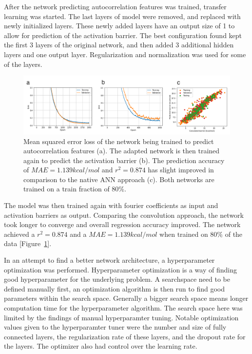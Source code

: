 After the network predicting autocorrelation features was trained, transfer learning was started.
The last layers of model were removed, and replaced with newly initialized layers.
These newly added layers have an output size of 1 to allow for prediction of the activation barrier.
The best configuration found kept the first 3 layers of the original network, and then added 3 additional hidden layers and one output layer.
Regularization and normalization was used for some of the layers.
\begin{figure}[H]
  \includegraphics[width=1.0\textwidth]{figures/regression/fourier/transfer/transfer-loss.png}
  \caption[LEFD transfer learning]{
  Mean squared error loss of the network being trained to predict autocorrelation features (a).
  The adapted network is then trained again to predict the activation barrier (b).
  The prediction accuracy of $MAE=1.139 kcal/mol$ and $r^2=0.874$ has slight improved in comparison to the native ANN approach (c).  
  Both networks are trained on a train fraction of 80\%.
  }
  \label{fig:transfer_final}
\end{figure}
The model was then trained again with fourier coefficients as input and activation barriers as output.
Comparing the convolution approach, the network took longer to converge and overall regression accuracy improved.
The network achieved a $r^2=0.874$ and a $MAE=1.139 kcal/mol$ when trained on 80\% of the data [Figure~\ref{fig:transfer_final}].



In an attempt to find a better network architecture, a hyperparameter optimization was performed.
Hyperparameter optimization is a way of finding good hyperparameter for the underlying problem.
A searchspace need to be defined manually first, an optimization algorithm is then run to find good parameters within the search space.
Generally a bigger search space means longer computation time for the hyperparameter algorithm.
The search space here was limited by the findings of manual hyperparamter tuning.
Notable optimization values given to the hyperparamter tuner were the number and size of fully connected layers, the regularization rate of these layers, and the dropout rate for the layers.
The optimizer also had control over the learning rate.


